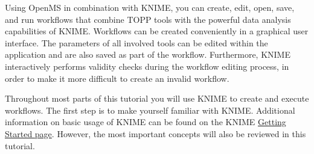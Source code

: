 Using OpenMS in combination with KNIME, you can create, edit, open, save, and run workflows
that combine TOPP tools with the powerful data analysis capabilities of KNIME. Workflows can
be created conveniently in a graphical user interface. The parameters of all involved
tools can be edited within the application and are also saved as part of the workflow.
Furthermore, KNIME interactively performs validity checks during the workflow editing
process, in order to make it more difficult to create an invalid workflow.

Throughout most parts of this tutorial you will use KNIME to create and
execute workflows. The first step is to make yourself familiar with KNIME. Additional
information on basic usage of KNIME can be found on the KNIME
\href{https://tech.knime.org/knime}{Getting Started page}. However,
the most important concepts will also be reviewed in this tutorial.

